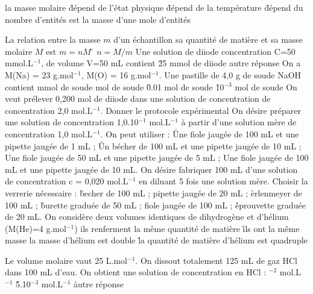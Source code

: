 \q la masse molaire 
\r dépend de l'état physique 
\r dépend de la température 
\r dépend du nombre d'entités 
\rv est la masse d'une mole d'entités 

\q La relation entre la masse $m$ d'un échantillon sa quantité de matière et sa masse molaire $M$ est
\rv
$m=nM$
\r
$n=M/m$
\q Une solution de diiode concentration C=50 mmol.L$^{-1}$, de volume V=50 mL contient
\r
25 mmol de diiode
\rv
autre réponse
\q On a M(Na) = 23 g.mol$^{-1}$, M(O) = 16 g.mol$^{-1}$. Une pastille de 4,0 g de soude NaOH contient 
 mmol de soude
 mol de soude
\r
0.01 mol de soude
\r 
10$^{-3}$ mol de soude
\q On veut prélever 0,200 mol de diiode dans une solution de concentration de concentration 2,0 mol.L$^{-1}$. Donner le protocole expérimental
\q	
On désire préparer une solution de concentration 1,0.10$^{-1}$ mol.L$^{-1}$ à partir  d'une solution mère de concentration 1,0 mol.L$^{-1}$.  On peut utiliser :
\r
Une fiole jaugée de 100 mL et une pipette jaugée de 1 mL ;
\r
Un bécher de 100 mL et une pipette jaugée de 10 mL ;
\rv
Une fiole jaugée de 50 mL et une pipette jaugée de 5 mL ;
\rv
Une fiole jaugée de 100 mL et une pipette jaugée de 10 mL.
\q	
On désire fabriquer 100 mL d'une solution de concentration   c = 0,020 mol.L$^{-1}$ en diluant 5 fois une solution mère. Choisir la verrerie nécessaire :
\r
becher de 100 mL ;		
\rv
pipette jaugée de 20 mL ;
\r
erlenmeyer de 100 mL ;	
\r
burette graduée de 50 mL ;
\rv
fiole jaugée de 100 mL ; 
\r
éprouvette graduée de 20 mL.
\q  On considère deux volumes identiques de dihydrogène et d'hélium (M(He)=4 g.mol$^{-1}$)
\rv ils renferment la même quantité de matière
\r ils ont la même masse
\rv la masse d'hélium est double
\r la quantité de matière d'hélium est quadruple 

\q Le volume molaire vaut 25 L.mol$^{-1}$. On dissout totalement 125 mL de gaz HCl dans 100 mL d'eau. On obtient une solution de concentration en HCl :
$^{-2}$ mol.L$^{-1}$
\r 5.10$^{-3}$ mol.L$^{-1}$
\r autre réponse
